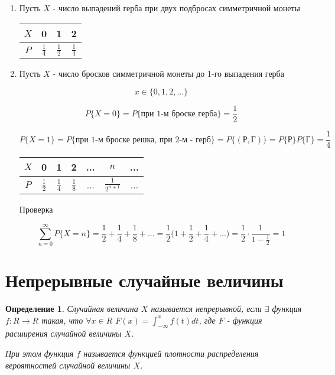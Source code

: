 \documentclass[a4paper, 14pt]{report}
\newtheorem{defenition}{Определение}[section]
\begin{document}
\begin{enumerate}
    \item Пусть $X$ - число выпадений герба при двух подбросах симметричной монеты

        \begin{tabular}{|c||c|c|c|}
                \hline
                $X$ & 0 & 1 & 2 \\
                \hline
                $P$ & $\frac{1}{4}$ & $\frac{1}{2}$ & $\frac{1}{4}$  \\
                \hline
        \end{tabular}

    \item Пусть $X$ - число бросков симметричной монеты до 1-го выпадения герба

        $$
        x \in \{0,1,2,...\}
        $$

        $$
        P\{X=0\} = P\{\text{при 1-м броске герба}\} = \frac{1}{2}
        $$

        $$
        P\{X=1\} = P\{\text{при 1-м броске решка, при 2-м - герб}\} = P\{(\text{Р},\text{Г})\} = P\{\text{Р}\} P\{\text{Г}\} = \frac{1}{4}
        $$

        \begin{tabular}{|c||c|c|c|c|c|c}
                \hline
                $X$ & 0 & 1 & 2 & ... & $n$ & ... \\
                \hline
                $P$ & $\frac{1}{2}$ & $\frac{1}{4}$ & $\frac{1}{8}$ & ... & $\frac{1}{2^{n+1}}$ & ...  \\
                \hline
        \end{tabular}

        Проверка

        $$
        \sum_{n=0}^\infty P\{X=n\} = \frac{1}{2} + \frac{1}{4} + \frac{1}{8} + ... = \frac{1}{2} \bigg(1 + \frac{1}{2} + \frac{1}{4} + ...\bigg) = \frac{1}{2} \cdot \frac{1}{1 - \frac{1}{2}} = 1
        $$

\end{enumerate}

\section{Непрерывные случайные величины}

\begin{defenition}
    Случайная величина $X$ называется непрерывной, если $\exists$ функция $f : R \to R$ такая,
    что $\forall x \in R$ $F(x) = \int_{-\infty}^x f(t) dt$, где $F$ - функция расширения случайной величины $X$.

    При этом функция $f$ называется функцией плотности распределения вероятностей случайной величины $X$.
\end{defenition}
\end{document}
